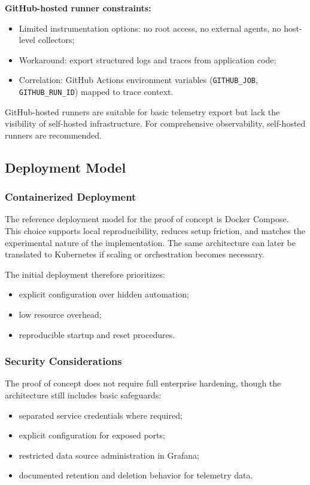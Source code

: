 \textbf{GitHub-hosted runner constraints:}
\begin{itemize}
    \item Limited instrumentation options: no root access, no external agents, no host-level collectors;
    \item Workaround: export structured logs and traces from application code;
    \item Correlation: GitHub Actions environment variables (\texttt{GITHUB\_JOB}, \texttt{GITHUB\_RUN\_ID}) mapped to trace context.
\end{itemize}

GitHub-hosted runners are suitable for basic telemetry export but lack the visibility of self-hosted infrastructure. For comprehensive observability, self-hosted runners are recommended.

\subsection{Deployment Model}
\label{subsec:deployment_model}

\subsubsection{Containerized Deployment}
\label{subsubsec:containerized_deployment}

The reference deployment model for the proof of concept is Docker Compose. This choice supports local reproducibility, reduces setup friction, and matches the experimental nature of the implementation. The same architecture can later be translated to Kubernetes if scaling or orchestration becomes necessary.

The initial deployment therefore prioritizes:
\begin{itemize}
    \item explicit configuration over hidden automation;
    \item low resource overhead;
    \item reproducible startup and reset procedures.
\end{itemize}

\subsubsection{Security Considerations}
\label{subsubsec:security_considerations}

The proof of concept does not require full enterprise hardening, though the architecture still includes basic safeguards:
\begin{itemize}
    \item separated service credentials where required;
    \item explicit configuration for exposed ports;
    \item restricted data source administration in Grafana;
    \item documented retention and deletion behavior for telemetry data.
\end{itemize}

